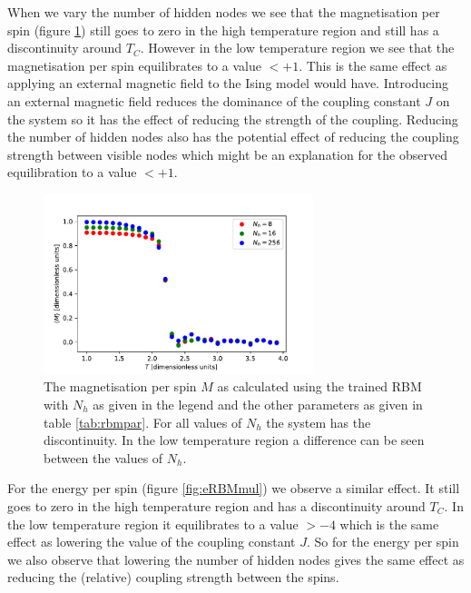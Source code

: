 \documentclass[10 pt, a4paper]{article}
\begin{document}
When we vary the number of hidden nodes we see that the magnetisation per spin (figure \ref{fig:magRBMmul}) still goes to zero in the high temperature region and still has a discontinuity around $T_C$. However in the low temperature region we see that the magnetisation per spin equilibrates to a value $< +1$. This is the same effect as applying an external magnetic field to the Ising model would have. Introducing an external magnetic field reduces the dominance of the coupling constant $J$ on the system so it has the effect of reducing the strength of the coupling. Reducing the number of hidden nodes also has the potential effect of reducing the coupling strength between visible nodes which might be an explanation for the observed equilibration to a value $< +1$.

\begin{figure}[H] 
\centering
\includegraphics[width=0.7\textwidth]{magRBMmulti}
\caption{The magnetisation per spin $M$ as calculated using the trained RBM with $N_h$ as given in the legend and the other parameters as given in table \ref{tab:rbmpar}. For all values of $N_h$ the system has the discontinuity. In the low temperature region a difference can be seen between the values of $N_h$. }
\label{fig:magRBMmul}
\end{figure}

For the energy per spin (figure \ref{fig:eRBMmul}) we observe a similar effect. It still goes to zero in the high temperature region and has a discontinuity around $T_C$. In the low temperature region it equilibrates to a value $> -4$ which is the same effect as lowering the value of the coupling constant $J$. So for the energy per spin we also observe that lowering the number of hidden nodes gives the same effect as reducing the (relative) coupling strength between the spins.
\end{document}
